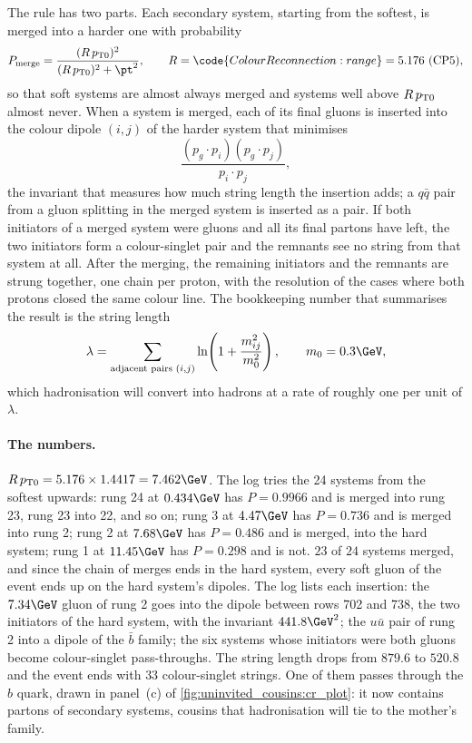 The rule has two parts. Each secondary system, starting from the softest,
is merged into a harder one with probability
\begin{equation}
  P_{\mathrm{merge}}=\frac{(R\,\ptzero)^2}{(R\,\ptzero)^2+\pt^2},
  \qquad R=\code{ColourReconnection:range}=5.176\ \text{(CP5)},
  \label{eq:uninvited_cousins:cr_prob}
\end{equation}
so that soft systems are almost always merged and systems well above
$R\,p_{\mathrm{T}0}$ almost never. When a system is merged, each of its final
gluons is inserted into the colour dipole $(i,j)$ of the harder system
that minimises
\begin{equation}
  \frac{(p_g\cdot p_i)(p_g\cdot p_j)}{p_i\cdot p_j},
  \label{eq:uninvited_cousins:insertion}
\end{equation}
the invariant that measures how much string length the insertion adds; a
$q\bar q$ pair from a gluon splitting in the merged system is inserted as
a pair. If both initiators of a merged system were gluons and all its
final partons have left, the two initiators form a colour-singlet pair and
the remnants see no string from that system at all. After the merging, the
remaining initiators and the remnants are strung together, one chain per
proton, with the resolution of the cases where both protons closed the
same colour line. The bookkeeping number that summarises the result is the
string length
\begin{equation}
  \lambda=\sum_{\text{adjacent pairs }(i,j)}\ln\!\left(1+\frac{m_{ij}^2}{m_0^2}\right),
  \qquad m_0=0.3\GeV,
  \label{eq:uninvited_cousins:lambda}
\end{equation}
which hadronisation will convert into hadrons at a rate of roughly one per
unit of $\lambda$.

\paragraph{The numbers.} $R\,\ptzero=5.176\times1.4417=7.462\GeV$. The log
tries the 24 systems from the softest upwards: rung 24 at $0.434\GeV$ has
$P=0.9966$ and is merged into rung 23, rung 23 into 22, and so on; rung 3
at $4.47\GeV$ has $P=0.736$ and is merged into rung 2; rung 2 at $7.68\GeV$
has $P=0.486$ and is merged, into the hard system; rung 1 at $11.45\GeV$
has $P=0.298$ and is not. $23$ of $24$ systems merged, and since the chain
of merges ends in the hard system, every soft gluon of the event ends up on
the hard system's dipoles. The log lists each insertion: the $7.34\GeV$
gluon of rung 2 goes into the dipole between rows 702 and 738, the two
initiators of the hard system, with the invariant $441.8\GeV^2$; the
$u\bar u$ pair of rung 2 into a dipole of the $\bar b$ family; the six
systems whose initiators were both gluons become colour-singlet
pass-throughs. The string length drops from $879.6$ to $520.8$ and the
event ends with $33$ colour-singlet strings. One of them passes through the
$b$ quark, drawn in panel~(c) of \cref{fig:uninvited_cousins:cr_plot}: it
now contains partons of secondary systems, cousins that hadronisation will
tie to the mother's family.

